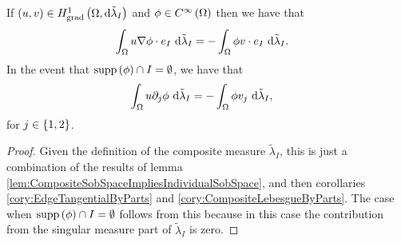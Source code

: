 \documentclass[11pt]{report}
\newcommand{\tlambda}{\tilde{\lambda}}
\begin{document}
\begin{theorem}
	If $\bracs{u,v}\in\gradSob{\ddom}{\tlambda_I}$ and $\phi\in C^{\infty}\left( \Omega \right)$ then we have that
	\begin{align*}
		\integral{\ddom}{u\grad\phi\cdot e_I}{\tlambda_I} &= -\integral{\ddom}{\phi v\cdot e_I}{\tlambda_I}.
	\end{align*}
	In the event that $\mathrm{supp}\left( \phi \right)\cap I = \emptyset$, we have that
	\begin{align*}
		\integral{\ddom}{u\partial_j\phi}{\tlambda_I} &= -\integral{\ddom}{\phi v_j}{\tlambda_I},
	\end{align*}
	for $j\in\left\{ 1,2 \right\}$.
\end{theorem}
\begin{proof}
	Given the definition of the composite measure $\tlambda_I$, this is just a combination of the results of lemma \ref{lem:CompositeSobSpaceImpliesIndividualSobSpace}, and then corollaries \ref{cory:EdgeTangentialByParts} and \ref{cory:CompositeLebesgueByParts}.
	The case when $\mathrm{supp}\left( \phi \right)\cap I = \emptyset$ follows from this because in this case the contribution from the singular measure part of $\tlambda_I$ is zero.
\end{proof}
\end{document}
